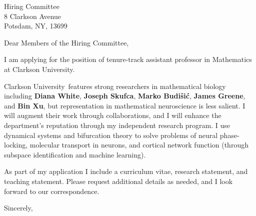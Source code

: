 \documentclass[11pt,a4paper]{letter}
\begin{document}
\def\School{Clarkson University}
\begin{letter}
{Hiring Committee\\
8 Clarkson Avenue\\
Potsdam, NY, 13699}


\opening{Dear Members of the Hiring Committee,}

I am applying for the position of tenure-track assistant professor in Mathematics at \School. 



\School~features strong researchers in mathematical biology including \textbf{Diana White}, \textbf{Joseph Skufca}, \textbf{Marko Budišić}, \textbf{James Greene}, and \textbf{Bin Xu}, but representation in mathematical neuroscience is less salient. I will augment their work through collaborations, and I will enhance the department's reputation through my independent research program. I use dynamical systems and bifurcation theory to solve problems of neural phase-locking, molecular transport in neurons, and cortical network function (through subspace identification and machine learning).



As part of my application I include a curriculum vitae, research statement, and teaching statement. Please request additional details as needed, and I look forward to our correspondence.

\closing{Sincerely,}
\end{letter}
\end{document}
